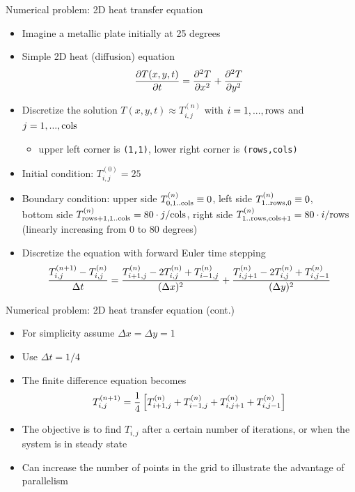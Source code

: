 \documentclass[10pt,xcolor=pdftex,dvipsnames,table]{beamer}
\newcommand{\tc}{\textcolor}
\begin{document}
\begin{frame}{Numerical problem: 2D heat transfer equation}
  {\let\normalsize\small \normalsize
    \begin{itemize}\setlength{\itemsep}{2mm}
    \item Imagine a metallic plate initially at 25 degrees
    \item Simple 2D heat (diffusion) equation
      \[
        {\partial T(x,y,t)\over\partial t}={\partial^2 T\over\partial x^2}+{\partial^2 T\over\partial y^2}
        \]
      \item Discretize the solution $T(x,y,t)\approx T^{(n)}_{i,j}$ with $i=1,...,{\rm rows}$ and
        $j=1,...,{\rm cols}$
        \begin{itemize}\setlength{\itemsep}{0.5mm}
        \item {\footnotesize upper left corner is \texttt{(1,1)}, lower right corner is \texttt{(rows,cols)}}
        \end{itemize}
      \item Initial condition: \tc{Emerald}{$T^{(0)}_{i,j}=25$}
      \item Boundary condition: \quad \tc{Mahogany}{upper side $T^{(n)}_{0,1..{\rm cols}}\equiv 0$},
        \quad \tc{Mahogany}{left side $T^{(n)}_{1..{\rm rows},0}\equiv 0$}, \\ \tc{NavyBlue}{bottom side
          $T^{(n)}_{{\rm rows}+1,1..{\rm cols}} = {80\cdot j/\rm cols}$}, \quad \tc{NavyBlue}{right side
          $T^{(n)}_{1..{\rm rows},{\rm cols}+1} = 80\cdot i/{\rm rows}$}\\ \tc{NavyBlue}{(linearly
              increasing from 0 to 80 degrees)}
      \item Discretize the equation with forward Euler time stepping
        \[
          {T^{(n+1)}_{i,j}-T^{(n)}_{i,j}\over\Delta t}=
          {T^{(n)}_{i+1,j}-2T^{(n)}_{i,j}+T^{(n)}_{i-1,j}\over(\Delta x)^2}+
          {T^{(n)}_{i,j+1}-2T^{(n)}_{i,j}+T^{(n)}_{i,j-1}\over(\Delta y)^2}
          \]
    \end{itemize}}
\end{frame}

\begin{frame}{Numerical problem: 2D heat transfer equation (cont.)}
  \begin{itemize}\setlength{\itemsep}{3mm}
    \item For simplicity assume $\Delta x=\Delta y=1$
    \item Use $\Delta t=1/4$
    \item The finite difference equation becomes
    \[
      T^{(n+1)}_{i,j} = {1\over4}\left[T^{(n)}_{i+1,j}+T^{(n)}_{i-1,j}+T^{(n)}_{i,j+1}+T^{(n)}_{i,j-1}\right]
    \]
    \item The objective is to find $T_{i,j}$ after a certain number of iterations, or when the system is
      in steady state
    \item Can increase the number of points in the grid to illustrate the advantage of parallelism
  \end{itemize}
\end{frame}
\end{document}
